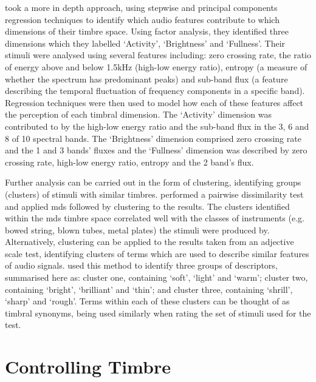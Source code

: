 		\citet{alluri2010exploring} took a more in depth approach, using stepwise and principal components
		regression techniques to identify which audio features contribute to which dimensions of their timbre
		space. Using factor analysis, they identified three dimensions which they labelled `Activity', `Brightness'
		and `Fullness'. Their stimuli were analysed using several features including: zero crossing rate, the ratio
		of energy above and below 1.5kHz (high-low energy ratio), entropy (a measure of whether the spectrum has
		predominant peaks) and sub-band flux (a feature describing the temporal fluctuation of frequency components
		in a specific band). Regression techniques were then used to model how each of these features affect the
		perception of each timbral dimension. The `Activity' dimension was contributed to by the high-low energy
		ratio and the sub-band flux in the 3, 6 and 8 of 10 spectral bands. The
		`Brightness' dimension comprised zero crossing rate and the 1 and 3 bands' fluxes and
		the `Fullness' dimension was described by zero crossing rate, high-low energy ratio, entropy and the
		2 band's flux.

		Further analysis can be carried out in the form of clustering, identifying groups (clusters) of stimuli
		with similar timbres. \citet{lakatos2000a} performed a pairwise dissimilarity test and applied
		\acrshort{mds} followed by clustering to the results. The clusters identified within the \acrshort{mds}
		timbre space correlated well with the classes of instruments (e.g. bowed string, blown tubes, metal plates)
		the stimuli were produced by.  Alternatively, clustering can be applied to the results taken from an
		adjective scale test, identifying clusters of terms which are used to describe similar features of audio
		signals.  \citet{zacharakis2011an2} used this method to identify three groups of descriptors, summarised
		here as: cluster one, containing `soft', `light' and `warm'; cluster two, containing `bright', `brilliant'
		and `thin'; and cluster three, containing `shrill', `sharp' and `rough'. Terms within each of these
		clusters can be thought of as timbral synonyms, being used similarly when rating the set of stimuli used
		for the test.

\section{Controlling Timbre}
\label{sec:Timbre-Control}

